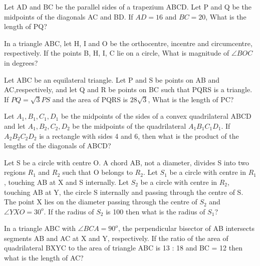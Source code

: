 \item Let AD and BC be the parallel sides of a trapezium ABCD. Let P and Q be the midpoints of the diagonals AC and BD. If $AD = 16$ and $BC = 20$, What is the length of PQ?

\item In a triangle ABC, let H, I and O be the orthocentre, incentre and circumcentre, respectively. If the points B, H, I, C lie on a circle, What is magnitude of $\angle BOC$ in degrees?

\item Let ABC be an equilateral triangle. Let P and S be points on AB and AC,respectively, and let Q and R be points on BC such that PQRS is a triangle. If $PQ = \sqrt{3}PS$ and the area of PQRS is $28\sqrt{3}$, What is the length of PC?

\item Let $A_1, B_1, C_1, D_1$ be the midpoints of the sides of a convex quadrilateral ABCD and let $A_1, B_2, C_2, D_2$ be the midpoints of the quadrilateral $A_1B_1C_1D_1$. If $A_2B_2C_2D_2$ is a rectangle with sides 4 and 6, then what is the product of the lengths of the diagonals of ABCD?

\item Let S be a circle with centre O. A chord AB, not a diameter, divides S into two regions $R_1$ and $R_2$ such that O belongs to $R_2$. Let $S_1$ be a circle with centre in $R_1$, touching AB at X and S internally. Let $S_2$ be a circle with centre in $R_2$, touching AB at Y, the circle S internally and passing through the centre of S. The point X lies on the diameter passing through the centre of  $S_2$ and $\angle YXO = 30^{o}$. If the radius of $S_2$ is 100 then what is the radius of $S_1$?

\item In a triangle ABC with $\angle BCA = 90^{o}$, the perpendicular bisector of AB intersects segments AB and AC at X and Y, respectively. If the ratio of the area of quadrilateral BXYC to the area of triangle ABC is 13 : 18 and BC = 12 then what is the length of AC?
